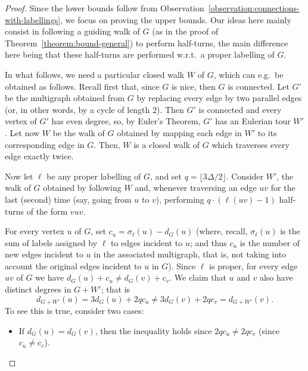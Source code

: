 \documentclass[a4paper,11pt,dvipsnames]{elsarticle}
\newcommand{\commenttext}[1]{ \begin{center} {\fbox{\begin{minipage}[h]{0.9 \linewidth}   {\textsf{ #1}} \end{minipage} }} \end{center}}
\newcommand{\Rom}[1]{{\color{blue}\commenttext{Rom : #1}}}
\newcommand{\Rom}[1]{}
\begin{document}
\begin{proof}
Since the lower bounds follow from Observation~\ref{observation:connections-with-labellings}, we focus on proving the upper bounds. Our ideas here mainly consist in following a guiding walk of $G$ (as in the proof of Theorem~\ref{theorem:bound-general}) to perform half-turns, the main difference here being that these half-turns are performed w.r.t.~a proper labelling of $G$.

In what follows, we need a particular closed walk $W$ of $G$, which can e.g.~be obtained as follows. Recall first that, since $G$ is nice, then $G$ is connected. Let $G'$ be the multigraph obtained from $G$ by replacing every edge by two parallel edges (or, in other words, by a cycle of length $2$). Then $G'$ is connected and every vertex of $G'$ has even degree, so, by Euler's Theorem, $G'$ has an Eulerian tour $W'$. Let now $W$ be the walk of $G$ obtained by mapping each edge in $W'$ to its corresponding edge in $G$. Then, $W$ is a closed walk of $G$ which traverses every edge exactly twice.



Now let $\ell$ be any proper labelling of $G$, and set $q=\lfloor 3\Delta/2 \rfloor$. Consider $W'$, the walk of $G$ obtained by following $W$ and, whenever traversing an edge $uv$ for the last (second) time (say, going from $u$ to $v$), performing $q \cdot (\ell(uv)-1)$ half-turns of the form $vuv$. 

For every vertex $u$ of $G$, set $c_u=\sigma_\ell(u)-d_G(u)$ (where, recall, $\sigma_\ell(u)$ is the sum of labels assigned by $\ell$ to edges incident to $u$; and thus $c_u$ is the number of new edges incident to $u$ in the associated multigraph, that is, not taking into account the original edges incident to $u$ in $G$).
Since $\ell$ is proper, for every edge $uv$ of $G$ we have $d_G(u)+c_u \neq d_G(v)+c_v$. We claim that $u$ and $v$ also have distinct degrees in $G+W'$; that is $$d_{G+W'}(u)=3d_G(u)+2qc_u \neq 3d_G(v)+2qc_v=d_{G+W'}(v).$$ To see this is true, consider two cases:
\begin{itemize}
    \item If $d_G(u) = d_G(v)$, then the inequality holds since $2qc_u \neq 2qc_v$ (since $c_u \neq c_v$).
    

\end{itemize}
\end{proof}
\end{document}
